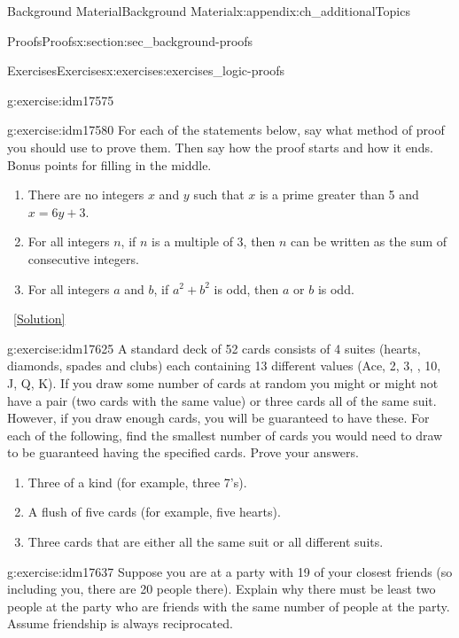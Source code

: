 \documentclass[oneside,10pt,]{book}
\numberwithin{equation}{chapter}
\begin{document}
\begin{appendixptx}{Background Material}{}{Background Material}{}{}{x:appendix:ch_additionalTopics}
\begin{sectionptx}{Proofs}{}{Proofs}{}{}{x:section:sec_background-proofs}
\begin{exercises-subsection}{Exercises}{}{Exercises}{}{}{x:exercises:exercises_logic-proofs}
\begin{divisionexercise}{14}{}{}{g:exercise:idm17575}
\end{divisionexercise}%
\begin{divisionexercise}{15}{}{}{g:exercise:idm17580}%
For each of the statements below, say what method of proof you should use to prove them. Then say how the proof starts and how it ends. Bonus points for filling in the middle.%
\par
%
\begin{enumerate}[label=(\alph*)]
\item{}There are no integers \(x\) and \(y\) such that \(x\) is a prime greater than 5 and \(x = 6y + 3\).%
\item{}For all integers \(n\), if \(n\) is a multiple of 3, then \(n\) can be written as the sum of consecutive integers.%
\item{}For all integers \(a\) and \(b\), if \(a^2 + b^2\) is odd, then \(a\) or \(b\) is odd.%
\end{enumerate}
%
\qquad~\hfill{\tiny\hyperlink{g:solution:idm17603-main}{[Solution]}}\end{divisionexercise}%
\begin{divisionexercise}{16}{}{}{g:exercise:idm17625}%
A standard deck of 52 cards consists of 4 suites (hearts, diamonds, spades and clubs) each containing 13 different values (Ace, 2, 3, \textellipsis{}, 10, J, Q, K). If you draw some number of cards at random you might or might not have a pair (two cards with the same value) or three cards all of the same suit. However, if you draw enough cards, you will be guaranteed to have these. For each of the following, find the smallest number of cards you would need to draw to be guaranteed having the specified cards. Prove your answers.%
\par
%
\begin{enumerate}[label=(\alph*)]
\item{}Three of a kind (for example, three 7's). %
\item{}A flush of five cards (for example, five hearts). %
\item{}Three cards that are either all the same suit or all different suits. %
\end{enumerate}
%
\end{divisionexercise}%
\begin{divisionexercise}{17}{}{}{g:exercise:idm17637}%
Suppose you are at a party with 19 of your closest friends (so including you, there are 20 people there). Explain why there must be least two people at the party who are friends with the same number of people at the party. Assume friendship is always reciprocated.%

\end{divisionexercise}
\end{exercises-subsection}
\end{sectionptx}
\end{appendixptx}
\end{document}
